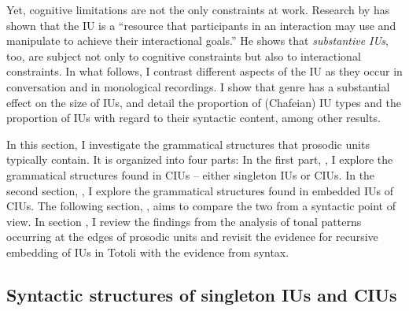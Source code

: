Yet, cognitive limitations are not the only constraints at work. Research by \citet[674]{Park_2002} has shown that the IU is a “resource that participants in an interaction may use and manipulate to achieve their interactional goals.” He shows that  \textit{substantive IUs}, too, are subject not only to cognitive constraints but also to interactional constraints. In what follows, I contrast different aspects of the IU as they occur in conversation and in monological recordings. I show that genre has a substantial effect on the size of IUs, and detail the proportion of (Chafeian) IU types and the proportion of IUs with regard to their syntactic content, among other results.









In this section, I investigate the grammatical structures that prosodic units typically contain. It is organized into four parts: In the first part, , I explore the grammatical structures found in CIUs -- either singleton IUs or CIUs. In the second section, , I explore the grammatical structures found in embedded IUs of CIUs. The following section, , aims to compare the two from a syntactic point of view. In section ,  I review the findings from the analysis of tonal patterns occurring at the edges of prosodic units and revisit the evidence for recursive embedding of IUs in Totoli with the evidence from syntax.











\subsection{Syntactic structures of singleton IUs and CIUs}
\label{sec:grammatical-units-and-the-intonation-unit}

